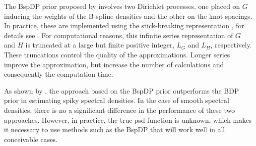 \documentclass[twocolumn,final]{svjour3}
\begin{document}

The BspDP prior proposed by \cite{Edwards2019}
 involves two  Dirichlet processes, one  placed on $G$ inducing  the weights of the B-spline densities and the other on the knot spacings.  In practice, these are implemented using   the  stick-breaking representation \citep{Sethuraman:1994}, for details see \cite{Edwards2019}. 
For computational reasons,  this infinite series representation of $G$ and $H$ is truncated at a large but finite positive integer, $L_G$ and $L_H$, respectively.  
These truncations control the quality of the approximations.  Longer series improve the approximation, but increase the number of calculations and consequently the computation time.

As shown by \cite{Edwards2019}, the approach based on the  BspDP prior outperforms the BDP prior in estimating spiky spectral densities.  In the case of smooth
spectral densities, there is no a significant difference in the performance of these two approaches.  However, in practice, the true psd function is unknown, which makes it necessary to use   methods such as the BspDP that will work well in all conceivable cases.
\end{document}
